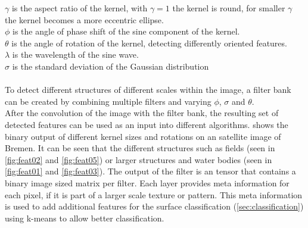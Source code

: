 \documentclass[12pt,a4paper, english,twoside]{scrartcl}
\begin{document}
    $\gamma$ is the aspect ratio of the kernel, with $\gamma = 1$ the kernel is round, for smaller $\gamma$ the kernel becomes a more eccentric ellipse.\\
    $\phi$ is the angle of phase shift of the sine component of the kernel. \\
    $\theta$ is the angle of rotation of the kernel, detecting differently oriented features.\\
    $\lambda$ is the wavelength of the sine wave. \\
    $\sigma$ is the standard deviation of the Gaussian distribution\\ \\
    \noindent
    To detect different structures of different scales within the image, a filter bank can be created by combining multiple filters and varying $\phi$, $\sigma$ and $\theta$.\\
    After the convolution of the image with the filter bank, the resulting set of detected features can be used as an input into different algorithms.
     shows the binary output of different kernel sizes and rotations on an satellite image of Bremen. 
    It can be seen that the different structures such as fields (seen in \cref{fig:feat02} and \cref{fig:feat05}) or larger structures and water bodies (seen in \cref{fig:feat01} and \cref{fig:feat03}).
    The output of the filter is an tensor that contains a binary image sized matrix per filter. Each layer provides meta information for each pixel, if it is part of a larger scale texture or pattern. 
    This meta information is used to add additional features for the surface classification (\cref{sec:classification}) using k-means %
    to allow better classification.%
\end{document}
